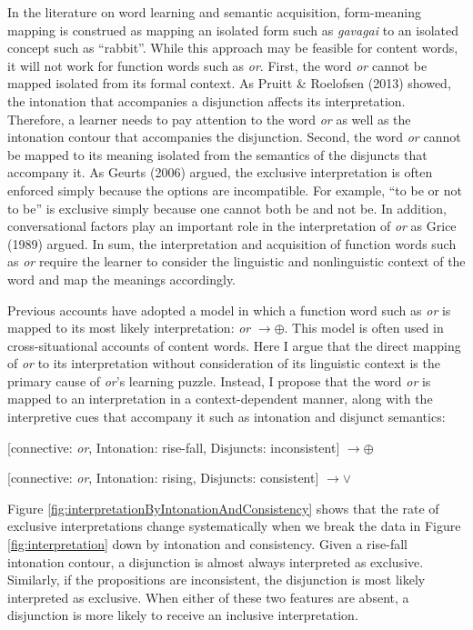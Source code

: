 \documentclass[oneside]{report}
\theoremstyle{definition}
\theoremstyle{definition}
\theoremstyle{definition}
\theoremstyle{remark}
\begin{document}
In the literature on word learning and semantic acquisition,
form-meaning mapping is construed as mapping an isolated form such as
\emph{gavagai} to an isolated concept such as ``rabbit''. While this
approach may be feasible for content words, it will not work for
function words such as \emph{or}. First, the word \emph{or} cannot be
mapped isolated from its formal context. As Pruitt \& Roelofsen (2013)
showed, the intonation that accompanies a disjunction affects its
interpretation. Therefore, a learner needs to pay attention to the word
\emph{or} as well as the intonation contour that accompanies the
disjunction. Second, the word \emph{or} cannot be mapped to its meaning
isolated from the semantics of the disjuncts that accompany it. As
Geurts (2006) argued, the exclusive interpretation is often enforced
simply because the options are incompatible. For example, ``to be or not
to be'' is exclusive simply because one cannot both be and not be. In
addition, conversational factors play an important role in the
interpretation of \emph{or} as Grice (1989) argued. In sum, the
interpretation and acquisition of function words such as \emph{or}
require the learner to consider the linguistic and nonlinguistic context
of the word and map the meanings accordingly.

Previous accounts have adopted a model in which a function word such as
\emph{or} is mapped to its most likely interpretation: \emph{or}
\(\rightarrow \oplus\). This model is often used in cross-situational
accounts of content words. Here I argue that the direct mapping of
\emph{or} to its interpretation without consideration of its linguistic
context is the primary cause of \emph{or}'s learning puzzle. Instead, I
propose that the word \emph{or} is mapped to an interpretation in a
context-dependent manner, along with the interpretive cues that
accompany it such as intonation and disjunct semantics:

{[}connective: \emph{or}, Intonation: rise-fall, Disjuncts:
inconsistent{]} \(\rightarrow \oplus\)

{[}connective: \emph{or}, Intonation: rising, Disjuncts: consistent{]}
\(\rightarrow \lor\)

Figure \ref{fig:interpretationByIntonationAndConsistency} shows that the
rate of exclusive interpretations change systematically when we break
the data in Figure \ref{fig:interpretation} down by intonation and
consistency. Given a rise-fall intonation contour, a disjunction is
almost always interpreted as exclusive. Similarly, if the propositions
are inconsistent, the disjunction is most likely interpreted as
exclusive. When either of these two features are absent, a disjunction
is more likely to receive an inclusive interpretation.
\end{document}
